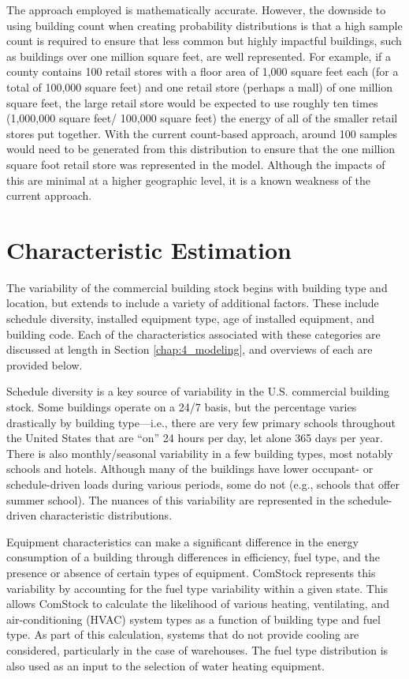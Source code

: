The approach employed is mathematically accurate. However, the downside to using building count when creating probability distributions is that a high sample count is required to ensure that less common but highly impactful buildings, such as buildings over one million square feet, are well represented. For example, if a county contains 100 retail stores with a floor area of 1,000 square feet each (for a total of 100,000 square feet) and one retail store (perhaps a mall) of one million square feet, the large retail store would be expected to use roughly ten times (1,000,000 square feet/ 100,000 square feet) the energy of all of the smaller retail stores put together. With the current count-based approach, around 100 samples would need to be generated from this distribution to ensure that the one million square foot retail store was represented in the model. Although the impacts of this are minimal at a higher geographic level, it is a known weakness of the current approach.

\section{Characteristic Estimation} \label{Characteristic Estimation}

The variability of the commercial building stock begins with building type and location, but extends to include a variety of additional factors. These include schedule diversity, installed equipment type, age of installed equipment, and building code. Each of the characteristics associated with these categories are discussed at length in Section \ref{chap:4_modeling}, and overviews of each are provided below.

Schedule diversity is a key source of variability in the U.S. commercial building stock. Some buildings operate on a 24/7 basis, but the percentage varies drastically by building type---i.e., there are very few primary schools throughout the United States that are ``on'' 24 hours per day, let alone 365 days per year. There is also monthly/seasonal variability in a few building types, most notably schools and hotels. Although many of the buildings have lower occupant- or schedule-driven loads during various periods, some do not (e.g., schools that offer summer school). The nuances of this variability are represented in the schedule-driven characteristic distributions.

Equipment characteristics can make a significant difference in the energy consumption of a building through differences in efficiency, fuel type, and the presence or absence of certain types of equipment. ComStock represents this variability by accounting for the fuel type variability within a given state. This allows ComStock to calculate the likelihood of various heating, ventilating, and air-conditioning (HVAC) system types as a function of building type and fuel type. As part of this calculation, systems that do not provide cooling are considered, particularly in the case of warehouses. The fuel type distribution is also used as an input to the selection of water heating equipment.

